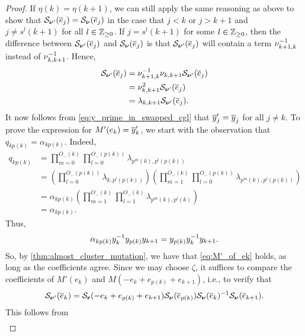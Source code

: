 \begin{proof}
	If $\eta(k) = \eta(k+1)$, we can still apply the same reasoning as above to show that
	$\mathcal{S}_{\boldsymbol{\nu}'}(\overline{e}_j) = \mathcal{S}_{\boldsymbol{\nu}}(\overline{e}_j)$ in the case that $j < k$ or $j > k+1$ and $j
		\neq s^l(k+1)$ for all $l \in \mathbb{Z}_{\geq 0}$. If $j = s^l (k+1)$ for some $l \in
		\mathbb{Z}_{\geq 0}$, then the difference between $\mathcal{S}_{\boldsymbol{\nu}'}(\overline{e}_j)$ and
	$\mathcal{S}_{\boldsymbol{\nu}}(\overline{e}_j)$ is that $\mathcal{S}_{\boldsymbol{\nu}'}(\overline{e}_j)$ will contain a term $\nu_{k+1,
			k}^{-1}$ instead of $\nu_{k, k+1}^{-1}$. Hence,
	\begin{align*}
		\mathcal{S}_{\boldsymbol{\nu}'}(\overline{e}_j) & = \nu_{k+1, k}^{-1} \nu_{k, k+1} \mathcal{S}_{\boldsymbol{\nu}'}(\overline{e}_j) \\
		                    & = \nu_{k, k+1}^2 \mathcal{S}_{\boldsymbol{\nu}'}(\overline{e}_j)                \\
		                    & = \lambda_{k, k+1} \mathcal{S}_{\boldsymbol{\nu}'}(\overline{e}_j).
	\end{align*}
	It now follows from \cref{eq:y_prime_in_swapped_cgl} that $\overline{y}'_j = \overline{y}_j$ for all $j\neq k$. To prove the expression for $M'(e_k) = \overline{y}'_k$, we start with the observation that $q_{kp(k)} = \alpha_{kp(k)}$. Indeed,
	\begin{align*}
		q_{kp(k)} & = \prod_{m=0}^{O_{-}(k)}\prod_{l=0}^{O_{-}(p(k))} \lambda_{p^m(k),p^l(p(k))}                                                                            \\
		          & = \left(\prod_{l = 0}^{O_{-}(p(k))}\lambda_{k, p^l(p(k))}\right)\left(\prod_{m=1}^{O_{-}(k)}\prod_{l=0}^{O_{-}(p(k))} \lambda_{p^m(k),p^l(p(k))}\right) \\
		          & = \alpha_{kp(k)}\left(\prod_{m=1}^{O_{-}(k)}\prod_{l=1}^{O_{-}(k)} \lambda_{p^m(k),p^l(k)}\right)                                                       \\
		          & = \alpha_{kp(k)}.
	\end{align*}
	Thus,
	\begin{equation*}
		\alpha_{kp(k)}y^{-1}_k y_{p(k)}y_{k+1} = y_{p(k)}y_k^{-1} y_{k+1}.
	\end{equation*}
	So, by \cref{thm:almost_cluster_mutation}, we have that \cref{eq:M'_of_ek} holds, as
	long as the coefficients agree. Since we may choose $\zeta$, it suffices to compare the
	coefficients of $M'(e_k)$ and $M(-e_k + e_{p(k)} + e_{k+1})$, i.e., to verify that
	\begin{equation*}
		\mathcal{S}_{\boldsymbol{\nu}'}(\overline{e}_k) = \mathcal{S}_{\mathbf{r}}(-e_k + e_{p(k)} + e_{k+1})\mathcal{S}_{\boldsymbol{\nu}}(\overline{e}_{p(k)})\mathcal{S}_{\boldsymbol{\nu}}(\overline{e}_k)^{-1} \mathcal{S}_{\boldsymbol{\nu}}(\overline{e}_{k+1}).
	\end{equation*}
	This follows from
	\begin{align*}

\end{align*}
\end{proof}
